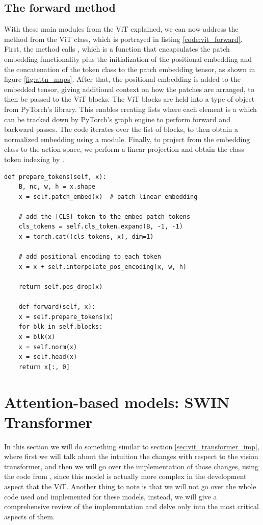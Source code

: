 \subsection{The forward method}
With these main modules from the ViT explained, we can now address the  method from the ViT class, which is portrayed in listing \ref{code:vit_forward}. First, the  method calls , which is a function that encapsulates the patch embedding functionality plus the initialization of the positional embedding and the concatenation of the token class to the patch embedding tensor, as shown in figure \ref{fig:attn_maps}. After that, the positional embedding is added to the embedded tensor, giving additional context on how the patches are arranged, to then be passed to the ViT blocks. The ViT blocks are held into a  type of object from PyTorch's library. This enables creating lists where each element is a  which can be tracked down by PyTorch's graph engine to perform forward and backward passes. The code iterates over the list of blocks, to then obtain a normalized embedding using a  module. Finally, to project from the embedding class to the action space, we perform a linear projection and obtain the class token indexing by .

\begin{lstlisting}[caption={ViT forward method}, label={code:vit_forward}]
	def prepare_tokens(self, x):
	B, nc, w, h = x.shape
	x = self.patch_embed(x)  # patch linear embedding
	
	# add the [CLS] token to the embed patch tokens
	cls_tokens = self.cls_token.expand(B, -1, -1)
	x = torch.cat((cls_tokens, x), dim=1)
	
	# add positional encoding to each token
	x = x + self.interpolate_pos_encoding(x, w, h)
	
	return self.pos_drop(x)
	
	def forward(self, x):
	x = self.prepare_tokens(x)
	for blk in self.blocks:
	x = blk(x)
	x = self.norm(x)
	x = self.head(x)
	return x[:, 0]
\end{lstlisting}

\section{Attention-based models: SWIN Transformer}
\label{sec:swin_transformer_rl}
In this section we will do something similar to section \ref{sec:vit_transformer_imp}, where first we will talk about the intuition the changes with respect to the vision transformer, and then we will go over the implementation of those changes, using the code from \cite{liu2021swin}, since this model is actually more complex in the development aspect that the ViT. Another thing to note is that we will not go over the whole code used and implemented for these models, instead, we will give a comprehensive review of the implementation and delve only into the most critical aspects of them.

